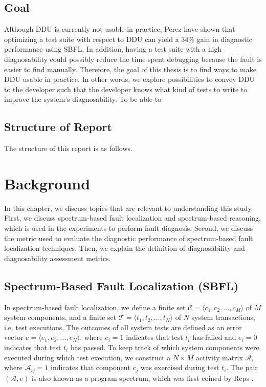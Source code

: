 \documentclass[twoside,a4paper,11pt]{memoir}
\begin{document}
\section{Goal}
Although DDU is currently not usable in practice, Perez \etal \cite{DBLP:conf/icse/PerezAD17} have shown that optimizing a test suite with respect to DDU can yield a 34\% gain in diagnostic performance using SBFL.
In addition, having a test suite with a high diagnosability could possibly reduce the time spent debugging because the fault is easier to find manually.
Therefore, the goal of this thesis is to find ways to make DDU usable in practice.
In other words, we explore possibilities to convey DDU to the developer such that the developer knows what kind of tests to write to improve the system's diagnosability.
To be able to


\section{Structure of Report}
The structure of this report is as follows.

\chapter{Background}
\label{ch:background}

In this chapter, we discuss topics that are relevant to understanding this study.
First, we discuss spectrum-based fault localization and spectrum-based reasoning, which is used in the experiments to perform fault diagnosis.
Second, we discuss the metric used to evaluate the diagnostic performance of spectrum-based fault localization techniques.
Then, we explain the definition of diagnosability and diagnosability assessment metrics.

\section{Spectrum-Based Fault Localization (SBFL)}
In spectrum-based fault localization, we define a finite set $\mathcal{C} = \langle c_1, c_2, \ldots, c_M \rangle$ of $M$ system components, and a finite set $\mathcal{T} = \langle t_1, t_2, \ldots, t_N \rangle$ of $N$ system transactions, i.e. test executions.
The outcomes of all system tests are defined as an error vector $e = \langle e_1, e_2, \ldots, e_N \rangle$, where $e_i = 1$ indicates that test $t_i$ has failed and $e_i = 0$ indicates that test $t_i$ has passed.
To keep track of which system components were executed during which test execution, we construct a $N \times M$ activity matrix $\mathcal{A}$, where $\mathcal{A}_{ij} = 1$ indicates that component $c_j$ was exercised during test $t_i$.
The pair $(\mathcal{A}, e)$ is also known as a program spectrum, which was first coined by Reps \etal \cite{reps1997use}.
\end{document}
